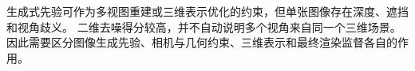 生成式先验可作为多视图重建或三维表示优化的约束，但单张图像存在深度、遮挡和视角歧义。
二维去噪得分较高，并不自动说明多个视角来自同一个三维场景。
因此需要区分图像生成先验、相机与几何约束、三维表示和最终渲染监督各自的作用。
